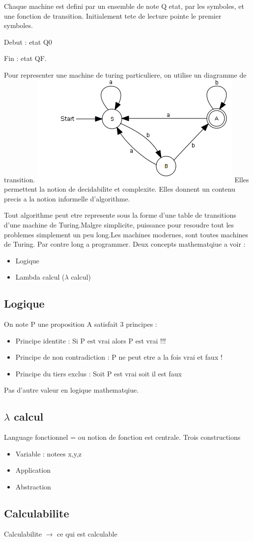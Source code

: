 \documentclass{article}
\begin{document}
Chaque machine est defini par un ensemble de note Q etat, par les symboles, et une fonction de transition.
Initialement tete de lecture pointe le premier symboles.

Debut : etat Q0

Fin : etat QF.

Pour representer une machine de turing particuliere, on utilise un diagramme de transition.
\newline
\newline
\includegraphics{img/statemachine.png}
\newline
Elles permettent la notion de decidabilite et complexite.
Elles donnent un contenu precis a la notion informelle d'algorithme.

Tout algorithme peut etre represente sous la forme d'une table de transitions d'une machine de Turing.Malgre simplicite, puissance pour resoudre tout les problemes simplement un peu long.Les machines modernes, sont toutes machines de Turing. Par contre long a programmer.
\newline
\newline
Deux concepts mathematqiue a voir :
\begin{itemize}[label=\textbullet]
	\item Logique
	\item Lambda calcul ($ \lambda $ calcul)
\end{itemize}

\subsection{Logique}
On note P une proposition
A satisfait 3 principes :
\begin{itemize}[label=\textbullet]
	\item Principe identite : Si P est vrai alors P est vrai !!!
	\item Principe de non contradiction : P ne peut etre a la fois vrai et faux !
	\item Principe du tiers exclus : Soit P est vrai soit il est faux
\end{itemize}
	Pas d'autre valeur en logique mathematqiue.

\subsection{$ \lambda $ calcul}

Language fonctionnel = ou notion de fonction est centrale.
Trois constructions
\begin{itemize}
	\item Variable : notees x,y,z
	\item Application
	\item Abstraction
\end{itemize}

\subsection{Calculabilite}
Calculabilite $ \rightarrow $ ce qui est calculable
\end{document}

